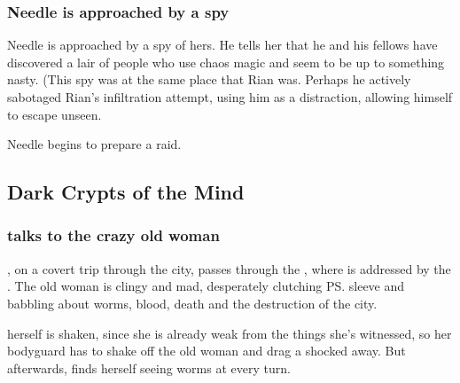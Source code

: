 \subsubsection{Needle is approached by a spy}
Needle is approached by a spy of hers. He tells her that he and his fellows have discovered a lair of people who use chaos magic and seem to be up to something nasty. (This spy was at the same place that Rian was. Perhaps he actively sabotaged Rian's infiltration attempt, using him as a distraction, allowing himself to escape unseen. 

Needle begins to prepare a raid. 









\subsection{Dark Crypts of the Mind}





\subsubsection{\Tiroco{} talks to the crazy old woman}
\Tiroco, on a covert trip through the city, passes through the , where is addressed by the . The old woman is clingy and mad, desperately clutching \ps{\Tiroco} sleeve and babbling about worms, blood, death and the destruction of the city. 

\Tiroco{} herself is shaken, since she is already weak from the things she's witnessed, so her bodyguard has to shake off the old woman and drag a shocked \Tiroco{} away. But afterwards, \Tiroco{} finds herself seeing worms at every turn.


